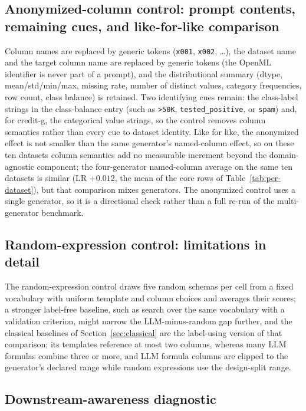 \subsection*{Anonymized-column control: prompt contents, remaining cues, and like-for-like comparison}

Column names are replaced by generic tokens (\texttt{x001}, \texttt{x002}, \ldots), the dataset name and the target column name are replaced by generic tokens (the OpenML identifier is never part of a prompt), and the distributional summary (dtype, mean/std/min/max, missing rate, number of distinct values, category frequencies, row count, class balance) is retained. Two identifying cues remain: the class-label strings in the class-balance entry (such as \texttt{>50K}, \texttt{tested\_positive}, or \texttt{spam}) and, for credit-g, the categorical value strings, so the control removes column semantics rather than every cue to dataset identity. Like for like, the anonymized effect is not smaller than the same generator's named-column effect, so on these ten datasets column semantics add no measurable increment beyond the domain-agnostic component; the four-generator named-column average on the same ten datasets is similar (LR \(+0.012\), the mean of the core rows of Table~\ref{tab:per-dataset}), but that comparison mixes generators. The anonymized control uses a single generator, so it is a directional check rather than a full re-run of the multi-generator benchmark.

\subsection*{Random-expression control: limitations in detail}

The random-expression control draws five random schemas per cell from a fixed vocabulary with uniform template and column choices and averages their scores; a stronger label-free baseline, such as search over the same vocabulary with a validation criterion, might narrow the LLM-minus-random gap further, and the classical baselines of Section~\ref{sec:classical} are the label-using version of that comparison; its templates reference at most two columns, whereas many LLM formulas combine three or more, and LLM formula columns are clipped to the generator's declared range while random expressions use the design-split range.

\subsection*{Downstream-awareness diagnostic}

